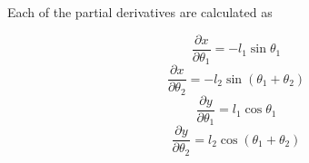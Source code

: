 \documentclass{article}
\begin{document}
	Each of the partial derivatives are calculated as
	
	\begin{equation}
	\frac{\partial x}{\partial \theta_1} = -l_1\sin{\theta_1}
	\end{equation}
	\begin{equation}
	\frac{\partial x}{\partial \theta_2} = -l_2\sin{(\theta_1 + \theta_2)}
	\end{equation}
	\begin{equation}
	\frac{\partial y}{\partial \theta_1} = l_1\cos{\theta_1}
	\end{equation}
	\begin{equation}
	\frac{\partial y}{\partial \theta_2} = l_2\cos{(\theta_1 + \theta_2)}
	\end{equation}
\end{document}
